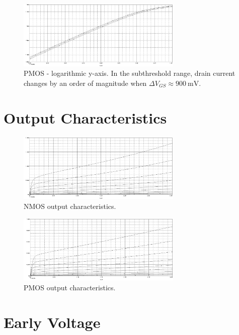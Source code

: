 \documentclass{article}
\begin{document}
	\begin{figure}[H]
	    \centering
	    \includegraphics[width=0.7\textwidth]{1-pmos-log}
	    \caption{PMOS - logarithmic y-axis. In the subthreshold range, drain current changes by an order of magnitude when $\Delta V_{GS} \approx \SI{900}{\mV}$.}
	\end{figure}


	\section{Output Characteristics}
	
	\begin{figure}[H]
	    \centering
	    \includegraphics[width=0.7\textwidth]{2-nmos-lin}
	    \caption{NMOS output characteristics.}
	\end{figure}


	\begin{figure}[H]
	    \centering
	    \includegraphics[width=0.7\textwidth]{2-pmos-lin}
	    \caption{PMOS output characteristics.}
	\end{figure}
	
	\section{Early Voltage}
\end{document}
